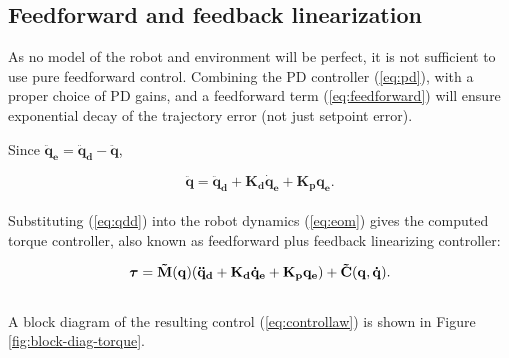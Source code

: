 \subsection{Feedforward and feedback linearization} \label{subsec:comp_torque}

As no model of the robot and environment will be perfect, it is not sufficient to use pure feedforward control. Combining the PD controller (\ref{eq:pd}), with a proper choice of PD gains, and a feedforward term (\ref{eq:feedforward}) will ensure exponential decay of the trajectory error (not just setpoint error).

Since $\mathbf{\ddot{q}_e = \ddot{q}_d - \ddot{q}}$,

\begin{equation}\label{eq:qdd}
    \mathbf{\ddot{q} = \ddot{q}_d + K_d \dot{q}_e + K_p q_e}.
\end{equation}
\\
Substituting (\ref{eq:qdd}) into the robot dynamics (\ref{eq:eom}) gives the computed torque controller, also known as feedforward plus feedback linearizing controller:

\begin{equation}\label{eq:controllaw}
    \boldsymbol{\tau} = \mathbf{\Tilde{M}(q) (\ddot{q}_d + K_d \dot{q}_e + K_p q_e) + \Tilde{C}(q,\dot{q})}.
\end{equation}
\\
A block diagram of the resulting control (\ref{eq:controllaw}) is shown in Figure \ref{fig:block-diag-torque}.


